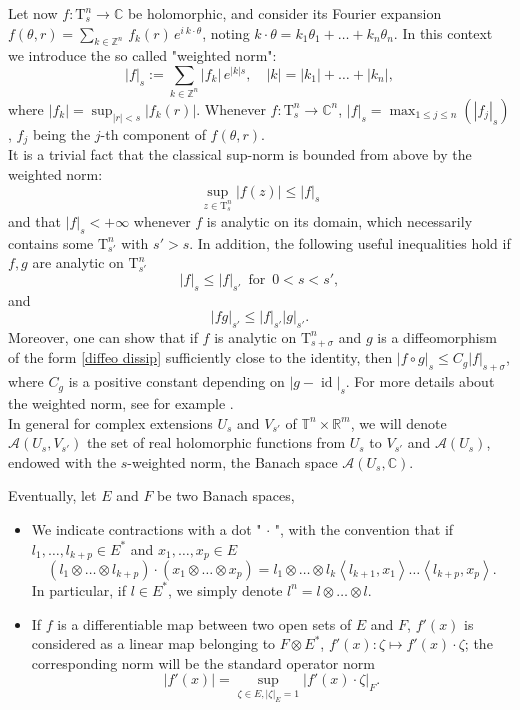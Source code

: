 \documentclass[oneside, 11pt]{amsbook}
\newcommand{\gen}[1]{{\left\langle #1\right\rangle}}
\newcommand{\abs}[1]{{\left|#1\right|}}
\newcommand{\normal}{\mathrm}
\newcommand{\T}{\mathbb{T}}
\newcommand{\Z}{\mathbb{Z}}
\newcommand{\R}{\mathbb{R}}
\newcommand{\C}{\mathbb{C}}
\newcommand{\teta}{\theta}
\newcommand{\tensor}{\otimes}%
\newcommand{\id}{\operatorname{id}}
\newcommand{\0}{{(0)}}
\newcommand{\3}{{(3)}}
\numberwithin{equation}{section}
\numberwithin{defn}{section}
\numberwithin{prop}{section}
\numberwithin{cor}{section}
\numberwithin{lemma}{section}
\numberwithin{rmk}{section}
\numberwithin{corollary}{section}
\begin{document}
Let now $f: \normal{T}^n_s\to \C$ be holomorphic, and consider its Fourier expansion $f(\teta,r)=\sum_{k\in\Z^n}\,f_k(r)\,e^{i\,k\cdot\teta}$, noting $k\cdot\teta = k_1\teta_1 +\ldots + k_n\teta_n$. In this context we introduce the so called "weighted norm": 
\begin{equation}\label{W norm}
	\abs{f}_s := \sum_{k\in\Z^n}\abs{f_k}\, e^{\abs{k}s},\quad \abs{k}=\abs{k_1}+\ldots +\abs{k_n},
\end{equation}
where $\abs{f_k}=\sup_{\abs{r}<s} \abs{f_k(r)}$. Whenever $f : \normal{T}^n_s\to\C^{n}$, $\abs{f}_s = \max_{1\leq j\leq n}(\abs{f_j}_s)$, $f_j$ being the $j$-th component of $f(\teta,r)$.\\ It is a trivial fact that the classical sup-norm is bounded from above by the weighted norm: \[\sup_{z\in{\normal{T}^n_s}}\abs{f(z)}\leq\abs{f}_s\] and that $\abs{f}_s<+\infty$ whenever $f$ is analytic on its domain, which necessarily contains some $\normal{T}^n_{s'}$ with $s'>s$. In addition, the following useful inequalities hold if $f,g$ are analytic on $\normal{T}^n_{s'}$ \[\abs{f}_s\leq\abs{f}_{s'}\,\text{ for }\, 0<s<s',\] and \[\abs{fg}_{s'}\leq \abs{f}_{s'}\abs{g}_{s'}.\] Moreover, one can show that if $f$ is analytic on $\normal{T}^n_{s+\sigma}$ and $g$ is a diffeomorphism of the form \eqref{diffeo dissip} sufficiently close to the identity, then $\abs{f\circ g}_s \leq C_g \abs{f}_{s+\sigma}$, where $C_g$ is a positive constant depending on $\abs{g - \id}_s$. For more details about the weighted norm, see for example \cite{Meyer:1975, Chierchia:2003}.\\
In general for complex extensions $U_s$ and $V_{s'}$ of $\T^n\times\R^m$, we will denote $\mathcal{A}(U_s,V_{s'})$ the set of real holomorphic functions from $U_s$ to $V_{s'}$ and $\mathcal{A}(U_s)$, endowed with the $s$-weighted norm, the Banach space $\mathcal{A}(U_s,\C)$.

Eventually, let $E$ and $F$ be two Banach spaces,

\begin{itemize}[leftmargin=*]
	\item We indicate contractions with a dot "$\,\cdot\,$", with the convention that if $l_1,\ldots, l_{k+p}\in E^\ast$ and $x_1,\ldots, x_p\in E$ 
	\begin{equation*}
		(l_1\tensor\ldots\tensor l_{k+p})\cdot (x_1\tensor\ldots\tensor x_p) = l_1\tensor\ldots \tensor l_k \gen{l_{k+1},x_1}\ldots \gen{l_{k+p},x_p}.
	\end{equation*}
	In particular, if $l\in E^\ast$, we simply denote $l^n= l\tensor\ldots\tensor l$.\\
	\item If $f$ is a differentiable map between two open sets of $E$ and $F$, $f'(x)$ is considered as a linear map belonging to $F\tensor E^{\ast}$,  $f'(x): \zeta\mapsto f'(x)\cdot\zeta$; the corresponding norm will be the standard operator norm \[\abs{f'(x)} = \sup_{\zeta\in E, \abs{\zeta}_E=1}\abs{f'(x)\cdot\zeta}_F.\]
\end{itemize}
\end{document}
